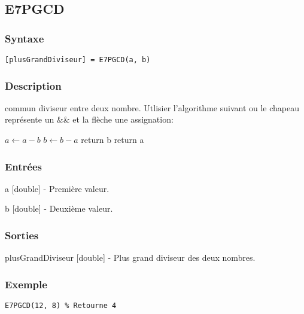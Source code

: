 \begin{minipage}{\linewidth}
\subsection*{E7PGCD}
\subsubsection*{Syntaxe}
\begin{lstlisting}
[plusGrandDiviseur] = E7PGCD(a, b)
\end{lstlisting}
\subsubsection*{Description}
commun diviseur entre deux nombre. Utlisier l'algorithme suivant ou le chapeau représente un \&\& et la flèche une assignation: \begin{algorithmic}   \State $a \gets a-b$ \Else \State $b \gets b-a$ \EndIf \EndWhile {} return b \Else return a \EndIf \end{algorithmic}
\subsubsection*{Entrées}
\begin{description}
\item a [double] - Première valeur. 
\item b [double] - Deuxième valeur. 
\end{description} \subsubsection*{Sorties}
\begin{description}
\item plusGrandDiviseur [double] - Plus grand diviseur des deux nombres. 
\end{description} 
\subsubsection*{Exemple}
\begin{lstlisting}
E7PGCD(12, 8) % Retourne 4
\end{lstlisting} \medskip
\end{minipage}